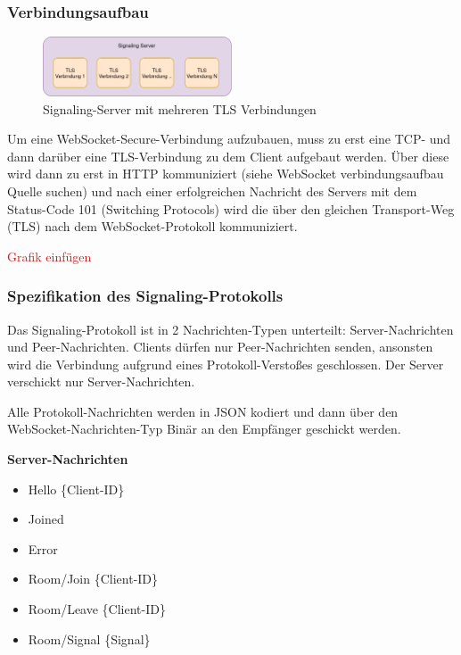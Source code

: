 \documentclass{IEEEtran}
\begin{document}
\begin{twocolumn}
\subsubsection{Verbindungsaufbau}

\begin{figure}[ht]
	\includegraphics[width=0.5\textwidth]{diagram-signaling-server-tls}
	\centering
	\caption{Signaling-Server mit mehreren TLS Verbindungen}
\end{figure}


Um eine WebSocket-Secure-Verbindung aufzubauen, muss zu erst eine TCP- und dann
darüber eine TLS-Verbindung zu dem Client aufgebaut werden. Über diese wird
dann zu erst in HTTP kommuniziert (siehe WebSocket verbindungsaufbau Quelle
suchen) und nach einer erfolgreichen Nachricht des Servers mit dem Status-Code
101 (Switching Protocols) wird die über den gleichen Transport-Weg (TLS)
nach dem WebSocket-Protokoll kommuniziert.

\textcolor{red}{Grafik einfügen}

\subsubsection{Spezifikation des Signaling-Protokolls}

Das Signaling-Protokoll ist in 2 Nachrichten-Typen unterteilt:
Server-Nachrichten und Peer-Nachrichten. Clients dürfen nur Peer-Nachrichten
senden, ansonsten wird die Verbindung aufgrund eines Protokoll-Verstoßes
geschlossen. Der Server verschickt nur Server-Nachrichten.

Alle Protokoll-Nachrichten werden in JSON kodiert und dann über den
WebSocket-Nachrichten-Typ Binär an den Empfänger geschickt werden.

\vspace{0.5em}

\textbf{Server-Nachrichten}

\begin{itemize}
	\item Hello \{Client-ID\}
	\item Joined
	\item Error
	\item Room/Join \{Client-ID\}
	\item Room/Leave \{Client-ID\}
	\item Room/Signal \{Signal\}
\end{itemize}


\end{twocolumn}
\end{document}
